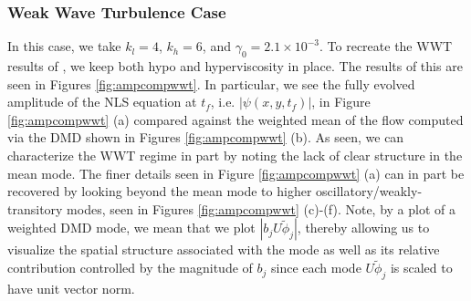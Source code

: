 \documentclass[a4paper,11pt]{article}
\begin{document}
\subsubsection*{Weak Wave Turbulence Case}
In this case, we take $k_{l}=4$, $k_{h}=6$, and $\gamma_{0}=2.1\times 10^{-3}$.  To recreate the WWT results of \cite{nazarenko2}, we keep both hypo and hyperviscosity in place.  The results of this are seen in Figures \ref{fig:ampcompwwt}.  In particular, we see the fully evolved amplitude of the NLS equation at $t_{f}$, i.e. $|\psi(x,y,t_{f})|$, in Figure \ref{fig:ampcompwwt} (a) compared against the weighted mean of the flow computed via the DMD shown in  Figures \ref{fig:ampcompwwt} (b).  As seen, we can characterize the WWT regime in part by noting the lack of clear structure in the mean mode.  The finer details seen in Figure \ref{fig:ampcompwwt} (a) can in part be recovered by looking beyond the mean mode to higher oscillatory/weakly-transitory modes, seen in Figures \ref{fig:ampcompwwt} (c)-(f).  Note, by a plot of a weighted DMD mode, we mean that we plot $\left|b_{j}U\tilde{\phi}_{j}\right|$, thereby allowing us to visualize the spatial structure associated with the mode as well as its relative contribution controlled by the magnitude of $b_{j}$ since each mode $U\tilde{\phi}_{j}$ is scaled to have unit vector norm.  
\end{document}
